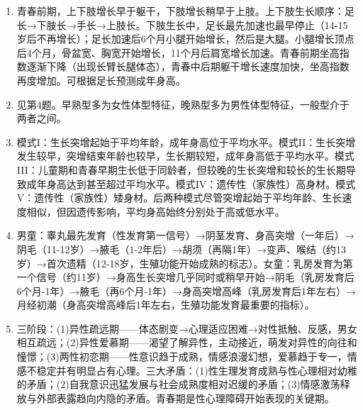 \begin{enumerate}[leftmargin=*, itemsep=5pt]
    \item 青春前期，上下肢增长早于躯干，下肢增长稍早于上肢。上下肢生长顺序：足长→下肢长→手长→上肢长。下肢生长中，足长最先加速也最早停止（14-15岁后不再增长）；足长加速后6个月小腿开始增长，然后是大腿。小腿增长顶点后4个月，骨盆宽、胸宽开始增长，11个月后肩宽增长加速。青春前期坐高指数逐渐下降（出现长臂长腿体态），青春中后期躯干增长速度加快，坐高指数再度增加。可根据足长预测成年身高。

    \item 见第4题。早熟型多为女性体型特征，晚熟型多为男性体型特征，一般型介于两者之间。

    \item 模式I：生长突增起始于平均年龄，成年身高位于平均水平。模式II：生长突增发生较早，突增结束年龄也较早，生长期较短，成年身高低于平均水平。模式III：儿童期和青春早期生长低于同龄者，但较晚的生长突增和较长的生长期导致成年身高达到甚至超过平均水平。模式IV：遗传性（家族性）高身材。模式V：遗传性（家族性）矮身材。后两种模式尽管突增起始于平均年龄、生长速度相似，但因遗传影响，平均身高始终分别处于高或低水平。

    \item 男童：睾丸最先发育（性发育第一信号）→阴茎发育、身高突增（一年后）→阴毛（11-12岁）→腋毛（1-2年后）→胡须（再隔1年）→变声、喉结（约13岁）→首次遗精（12-18岁，生殖功能开始成熟的标志）。女童：乳房发育为第一个信号（约11岁）→身高生长突增几乎同时或稍早开始→阴毛（乳房发育后6个月-1年）→腋毛（再6个月-1年）→身高突增高峰（乳房发育后1年左右）→月经初潮（身高突增高峰后1年左右，生殖功能发育最重要的指标）。

    \item 三阶段：(1)异性疏远期——体态剧变→心理适应困难→对性抵触、反感，男女相互疏远；(2)异性爱慕期——渴望了解异性，主动接近，萌发对异性的向往和憧憬；(3)两性初恋期——性意识趋于成熟，情感浪漫幻想，爱慕趋于专一，情感不稳定并有明显占有心理。三大矛盾：(1)性生理发育成熟与性心理相对幼稚的矛盾；(2)自我意识迅猛发展与社会成熟度相对迟缓的矛盾；(3)情感激荡释放与外部表露趋向内隐的矛盾。青春期是性心理障碍开始表现的关键期。
\end{enumerate}

\newpage
